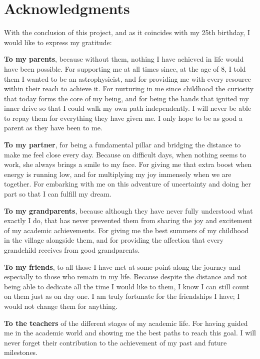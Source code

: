 
\section*{Acknowledgments}

With the conclusion of this project, and as it coincides with my 25th birthday, I would like to express my gratitude:

\textbf{To my parents}, because without them, nothing I have achieved in life would have been possible. For supporting me at all times since, at the age of 8, I told them I wanted to be an astrophysicist, and for providing me with every resource within their reach to achieve it. For nurturing in me since childhood the curiosity that today forms the core of my being, and for being the hands that ignited my inner drive so that I could walk my own path independently. I will never be able to repay them for everything they have given me. I only hope to be as good a parent as they have been to me.

\textbf{To my partner}, for being a fundamental pillar and bridging the distance to make me feel close every day. Because on difficult days, when nothing seems to work, she always brings a smile to my face. For giving me that extra boost when energy is running low, and for multiplying my joy immensely when we are together. For embarking with me on this adventure of uncertainty and doing her part so that I can fulfill my dream.

\textbf{To my grandparents}, because although they have never fully understood what exactly I do, that has never prevented them from sharing the joy and excitement of my academic achievements. For giving me the best summers of my childhood in the village alongside them, and for providing the affection that every grandchild receives from good grandparents.

\textbf{To my friends}, to all those I have met at some point along the journey and especially to those who remain in my life. Because despite the distance and not being able to dedicate all the time I would like to them, I know I can still count on them just as on day one. I am truly fortunate for the friendships I have; I would not change them for anything.

\textbf{To the teachers} of the different stages of my academic life. For having guided me in the academic world and showing me the best paths to reach this goal. I will never forget their contribution to the achievement of my past and future milestones.

